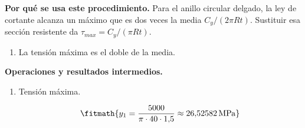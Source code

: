 \noindent\textbf{Por qué se usa este procedimiento.} Para el anillo circular delgado, la ley de cortante alcanza un máximo que es dos veces la media $C_y/(2\pi Rt)$. Sustituir esa sección resistente da $\tau_{max}=C_y/(\pi Rt)$.

\begin{enumerate}

\item La tensión máxima es el doble de la media.

\end{enumerate}

\noindent\textbf{Operaciones y resultados intermedios.}

\begin{enumerate}

\item Tensión máxima.

\[\fitmath{y_{1}=\frac{5000}{\pi\cdot 40\cdot 1{,}5}\approx 26{,}52582\,\mathrm{MPa}}\]

\end{enumerate}
